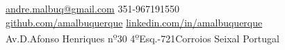 \documentclass[10pt,a4paper]{article}
\newcommand{\ulo}{\textsuperscript{\b{o}}} %
\begin{document}
\sloppy  %



\nobreakvspace{0.3em}  %

\noindent\href{mailto:andre.malbuq.at.gmail.com}{andre.malbuq\mbox{}@\mbox{}gmail.com}\sbull
\textsmaller{+}351-967191550
\\
\noindent\href{https://github.com/amalbuquerque}{github.com/amalbuquerque}\sbull
\href{http://linkedin.com/in/amalbuquerque}{linkedin.com/in/amalbuquerque}
\\
Av.\thinspace D.\thinspace Afonso Henriques n\ulo 30 4\ulo Esq.-721\thinspace Corroios\sbull
Seixal\sbull
Portugal

\spacedhrule{0.9em}{-0.4em}  %

\end{document}
